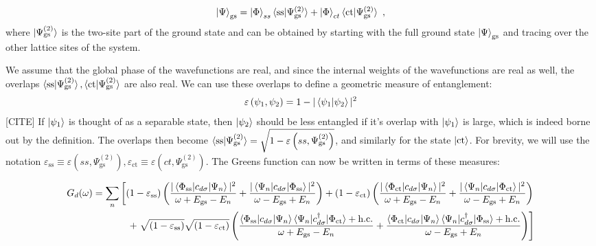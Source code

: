 \documentclass[reprint,superscriptaddress,floatfix]{revtex4-2}
\begin{document}
\begin{equation}\begin{aligned}
	\ket{\Psi}_\text{gs} = \ket{\Phi}_{ss}\braket{\text{ss}|\Psi^{(2)}_\text{gs}} + \ket{\Phi}_{ct}\braket{\text{ct}|\Psi^{(2)}_\text{gs}}~,
\end{aligned}\end{equation}
where \(\ket{\Psi^{(2)}_\text{gs}}\) is the two-site part of the ground state and can be obtained by starting with the full ground state \(\ket{\Psi}_\text{gs}\) and tracing over the other lattice sites of the system.

{\color{blue}We assume that the global phase of the wavefunctions are real}, and since the internal weights of the wavefunctions are real as well, the overlaps \(\braket{\text{ss}|\Psi^{(2)}_\text{gs}},\braket{\text{ct}|\Psi^{(2)}_\text{gs}}\) are also real. We can use these overlaps to define a geometric measure of entanglement:
\begin{equation}\begin{aligned}
	\varepsilon\left(\psi_1,\psi_2\right) = 1 - |\braket{\psi_1 | \psi_2}|^2
\end{aligned}\end{equation}
[CITE]
If \(\ket{\psi_1}\) is thought of as a separable state, then \(\ket{\psi_2}\) should be less entangled if it's overlap with \(\ket{\psi_1}\) is large, which is indeed borne out by the definition.
The overlaps then become \(\braket{\text{ss}|\Psi^{(2)}_\text{gs}} = \sqrt{1 - \varepsilon\left(ss,\Psi^{(2)}_\text{gs}\right)}\), and similarly for the state \(\ket{\text{ct}}\). For brevity, we will use the notation \(\varepsilon_\text{ss} \equiv \varepsilon\left(ss,\Psi^{(2)}_\text{gs}\right), \varepsilon_\text{ct} \equiv \varepsilon\left(ct,\Psi^{(2)}_\text{gs}\right)\). The Greens function can now be written in terms of these measures:
\begin{widetext}
\begin{equation}\begin{aligned}
	G_d(\omega) = \sum_n \left[\left(1 - \varepsilon_\text{ss} \right) \left(\frac{|\braket{\Phi_\text{ss} | c_{d\sigma} | \Psi_n}|^2}{\omega + E_\text{gs} - E_n} + \frac{|\braket{\Psi_n | c_{d\sigma} | \Phi_\text{ss}}|^2}{\omega - E_\text{gs} + E_n}\right) + \left(1 - \varepsilon_\text{ct} \right) \left(\frac{|\braket{\Phi_\text{ct} | c_{d\sigma} | \Psi_n}|^2}{\omega + E_\text{gs} - E_n} + \frac{|\braket{\Psi_n | c_{d\sigma} | \Phi_\text{ct}}|^2}{\omega - E_\text{gs} + E_n}\right)\right.\\
	+ \left. \sqrt{\left(1 - \varepsilon_\text{ss} \right)}\sqrt{\left(1 - \varepsilon_\text{ct} \right)} \left(\frac{\braket{\Phi_\text{ss} | c_{d\sigma} | \Psi_n}\braket{\Psi_n | c^\dagger_{d\sigma} | \Phi_\text{ct}} + \text{h.c.}}{\omega + E_\text{gs} - E_n} + \frac{\braket{\Phi_\text{ct} | c_{d\sigma} | \Psi_n}\braket{\Psi_n | c^\dagger_{d\sigma} | \Phi_\text{ss}} + \text{h.c.}}{\omega - E_\text{gs} + E_n}\right)\right]
\end{aligned}\end{equation}
\end{widetext}
\end{document}
